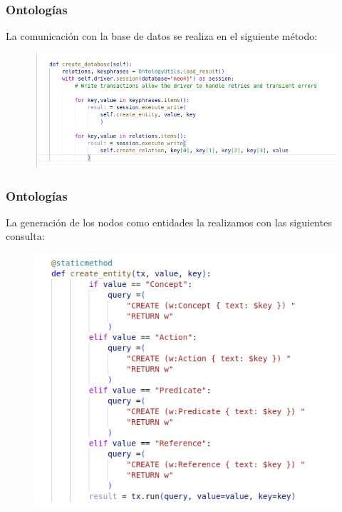 \documentclass[
11pt, %
%
aspectratio=169, %
]{beamer}
\begin{document}
	\begin{frame}
		\frametitle{Ontolog\'ias}
		
		La comunicación con la base de datos se realiza en el siguiente método:
		
			\begin{figure}[h!]
			\centering
			\includegraphics[scale=0.5]{../images/createdatabase.png}
		\end{figure} 	
		
		
	\end{frame}

	\begin{frame}
		\frametitle{Ontolog\'ias}
		
		La generación de los nodos como entidades la realizamos con las siguientes consulta:
		
		\begin{figure}[h!]
			\centering
			\includegraphics[scale=0.3]{../images/imageEntities.png}
		\end{figure} 	
		
		
	\end{frame}
\end{document}
